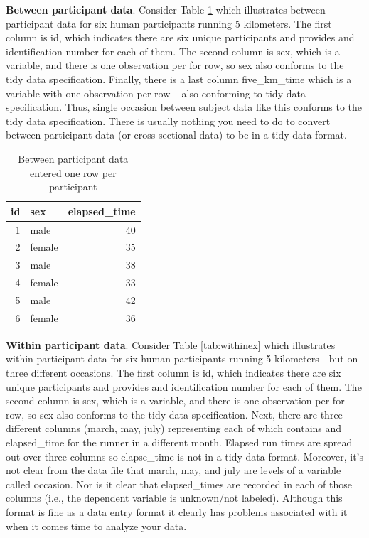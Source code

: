 \documentclass[
]{krantz}
\begin{document}
\textbf{Between participant data}. Consider Table \ref{tab:betweenex} which illustrates between participant data for six human participants running 5 kilometers. The first column is id, which indicates there are six unique participants and provides and identification number for each of them. The second column is sex, which is a variable, and there is one observation per for row, so sex also conforms to the tidy data specification. Finally, there is a last column five\_km\_time which is a variable with one observation per row -- also conforming to tidy data specification. Thus, single occasion between subject data like this conforms to the tidy data specification. There is usually nothing you need to do to convert between participant data (or cross-sectional data) to be in a tidy data format.

\begin{table}

\caption{\label{tab:betweenex}Between participant data entered one row per participant}
\centering
\begin{tabular}[t]{rlr}
\toprule
id & sex & elapsed\_time\\
\midrule
1 & male & 40\\
2 & female & 35\\
3 & male & 38\\
4 & female & 33\\
5 & male & 42\\
6 & female & 36\\
\bottomrule
\end{tabular}
\end{table}

\textbf{Within participant data}. Consider Table \ref{tab:withinex} which illustrates within participant data for six human participants running 5 kilometers - but on three different occasions. The first column is id, which indicates there are six unique participants and provides and identification number for each of them. The second column is sex, which is a variable, and there is one observation per for row, so sex also conforms to the tidy data specification. Next, there are three different columns (march, may, july) representing each of which contains and elapsed\_time for the runner in a different month. Elapsed run times are spread out over three columns so elapse\_time is not in a tidy data format. Moreover, it's not clear from the data file that march, may, and july are levels of a variable called occasion. Nor is it clear that elapsed\_times are recorded in each of those columns (i.e., the dependent variable is unknown/not labeled). Although this format is fine as a data entry format it clearly has problems associated with it when it comes time to analyze your data.
\end{document}
